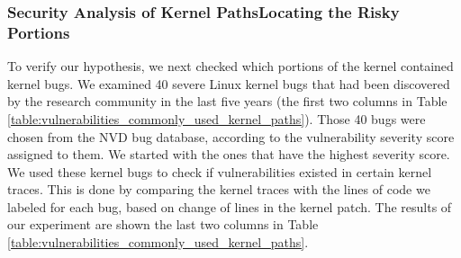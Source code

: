 \subsubsection{Security Analysis of Kernel Paths\textendash Locating the
Risky Portions}

To verify our hypothesis, we next checked which portions of
the kernel contained kernel bugs. We examined 40 severe Linux kernel
bugs that had been discovered by the research community in the last five
years (the first two columns in Table 
\ref{table:vulnerabilities_commonly_used_kernel_paths}). 
Those 40 bugs were chosen from the NVD bug database, according to 
the vulnerability severity score assigned to them. We started with the ones 
that have the highest severity score. 
We used these kernel bugs to check if vulnerabilities existed in certain
kernel traces. This is done by comparing the kernel traces with the lines 
of code we labeled for each bug, based on change of lines in the 
kernel patch.   
The results of our experiment are shown the last two columns in Table
\ref{table:vulnerabilities_commonly_used_kernel_paths}.

